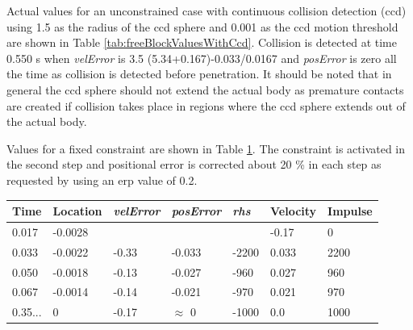Actual values for an unconstrained case with continuous collision detection (ccd) using 1.5 
as the radius of the ccd sphere and 0.001 as the ccd motion threshold
are shown in Table \ref{tab:freeBlockValuesWithCcd}. Collision is detected at time 0.550 s when
{\it velError} is  3.5 (5.34+0.167)-0.033/0.0167 and
{\it posError} is  zero all the time as collision is detected before penetration. 
It should be noted that in general the ccd sphere should not extend the actual body as 
premature contacts are created if collision takes place in regions where the ccd sphere extends out of the actual body.

\begin {table}
\label{tab:freeBlockValuesWithCcd} 
\end {table}

Values for a fixed constraint are shown in Table
\ref{tab:fixedBlockValues}. The constraint is activated in the second step and positional error is corrected
about 20 \% in each step as requested by using an erp value of 0.2.

\begin{table}
 {
\begin{tabular}{|l|l| l| l|l|l|l|}
\hline
{\bf Time} & 
{\bf Location} &
{\it velError} & {\it posError} & {\it rhs} &
{\bf Velocity} & 
{\bf Impulse} \\  \hline
0.017 & -0.0028 & & & 	 & -0.17 & 0 \\  \hline
0.033 & -0.0022 & -0.33 & -0.033 & -2200 & 0.033 & 2200 \\  \hline
0.050 & -0.0018 & -0.13 & -0.027 & -960 & 0.027 & 960 \\  \hline
0.067 & -0.0014 &-0.14 & -0.021 & -970 & 0.021 & 970 \\  \hline
0.35... & 0 &-0.17 & $\approx$ 0 & -1000 &0.0 & 1000 \\  \hline
\end {tabular}}
\label{tab:fixedBlockValues} 
\end {table}


